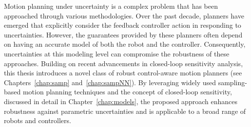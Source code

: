 Motion planning under uncertainty is a complex problem that has been approached through various methodologies. 
Over the past decade, planners have emerged that explicitly consider the feedback controller action in responding to uncertainties. 
However, the guarantees provided by these planners often depend on having an accurate model of both the robot and the controller. 
Consequently, uncertainties at this modeling level can compromise the robustness of these approaches. 
Building on recent advancements in closed-loop sensitivity analysis, this thesis introduces a novel class of robust control-aware motion planners (see Chapters~\ref{chap:samp} and~\ref{chap:sampNN}). 
By leveraging widely used sampling-based motion planning techniques and the concept of closed-loop sensitivity, discussed in detail in Chapter~\ref{chap:models}, the proposed approach enhances robustness against parametric uncertainties and is applicable to a broad range of robots and controllers. 